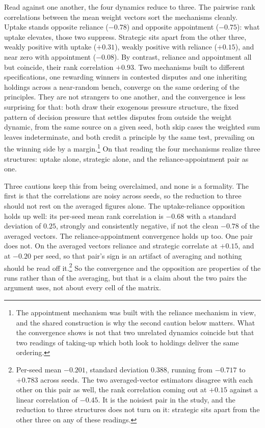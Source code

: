 Read against one another, the four dynamics reduce to three. The
pairwise rank correlations between the mean weight vectors sort the
mechanisms cleanly. Uptake stands opposite reliance
($-0.78$) and opposite appointment ($-0.75$): what uptake elevates,
those two suppress. Strategic sits apart from the other three, weakly positive with uptake ($+0.31$),
weakly positive with reliance ($+0.15$), and near zero with appointment
($-0.08$). By contrast, reliance and appointment
all but coincide, their rank correlation $+0.93$. Two mechanisms built to different specifications, one rewarding winners in
contested disputes and one inheriting holdings across a near-random bench,
converge on the same ordering of the principles. They are not strangers to one
another, and the convergence is less surprising for that: both draw their
exogenous pressure structure, the fixed pattern of decision pressure that
settles disputes from outside the weight dynamic, from the same source on a
given seed, both skip
cases the weighted sum leaves indeterminate, and both credit a principle by
the same test, prevailing on the winning side by a
margin.\footnote{The appointment mechanism was built with the reliance
mechanism in view, and the shared construction is why the second caution below
matters. What the convergence shows is not that two unrelated dynamics
coincide but that two readings of taking-up which both look to holdings
deliver the same ordering.} On that reading the four
mechanisms realize three structures: uptake alone, strategic alone, and the
reliance-appointment pair as one.

Three cautions keep this from being overclaimed, and none is a formality. The
first is that the correlations are noisy across seeds, so the reduction to
three should not rest on the averaged figures alone. The uptake-reliance
opposition holds up well: its per-seed mean rank correlation is $-0.68$ with a
standard deviation of $0.25$, strongly and consistently negative, if not the
clean $-0.78$ of the averaged vectors. The reliance-appointment convergence holds up
too. One pair does not. On the averaged vectors reliance and strategic correlate at $+0.15$, and at
$-0.20$ per seed, so that pair's sign is an artifact
of averaging and nothing should be read off it.\footnote{Per-seed mean
$-0.201$, standard deviation $0.388$, running from $-0.717$ to $+0.783$ across
seeds. The two averaged-vector estimators disagree with each other on this
pair as well, the rank correlation coming out at $+0.15$ against a linear
correlation of $-0.45$. It is the noisiest pair in the study, and the
reduction to three structures does not turn on it: strategic sits apart from
the other three on any of these readings.} So the convergence and the
opposition are properties of the runs rather than of the averaging, but that
is a claim about the two pairs the argument uses, not about every cell of the
matrix.

